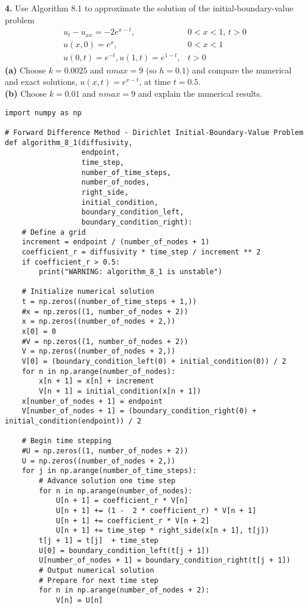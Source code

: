 \documentclass{amsbook}%
\theoremstyle{plain}
\numberwithin{equation}{section}
\begin{document}
		\noindent\textbf{4.} Use Algorithm 8.1 to approximate the solution of the initial-boundary-value problem
		\begin{align}
			u_t-u_{xx}=-2e^{x-t}, & 0<x<1,\, t>0\\
			u(x,0)=e^x, & 0<x<1\\
			u(0,t)=e^{-t}, u(1,t)=e^{1-t}, & t>0
		\end{align}
		\textbf{(a)} Choose $k=0.0025$ and $nmax=9$ (so $h=0.1$) and compare the numerical and exact solutions, $u(x,t)=e^{x-t}$, at time $t=0.5$.\\
		\textbf{(b)} Choose $k=0.01$ and $nmax=9$ and explain the numerical results.
		\\[12pt]
\begin{small}
\begin{verbatim}
import numpy as np

# Forward Difference Method - Dirichlet Initial-Boundary-Value Problem
def algorithm_8_1(diffusivity,
                  endpoint,
                  time_step,
                  number_of_time_steps,
                  number_of_nodes,
                  right_side,
                  initial_condition,
                  boundary_condition_left,
                  boundary_condition_right):
    # Define a grid
    increment = endpoint / (number_of_nodes + 1)
    coefficient_r = diffusivity * time_step / increment ** 2
    if coefficient_r > 0.5:
        print("WARNING: algorithm_8_1 is unstable")
        
    # Initialize numerical solution
    t = np.zeros((number_of_time_steps + 1,))
    #x = np.zeros((1, number_of_nodes + 2))
    x = np.zeros((number_of_nodes + 2,))
    x[0] = 0
    #V = np.zeros((1, number_of_nodes + 2))
    V = np.zeros((number_of_nodes + 2,))
    V[0] = (boundary_condition_left(0) + initial_condition(0)) / 2
    for n in np.arange(number_of_nodes):
        x[n + 1] = x[n] + increment
        V[n + 1] = initial_condition(x[n + 1])
    x[number_of_nodes + 1] = endpoint
    V[number_of_nodes + 1] = (boundary_condition_right(0) + initial_condition(endpoint)) / 2

    # Begin time stepping
    #U = np.zeros((1, number_of_nodes + 2))
    U = np.zeros((number_of_nodes + 2,))    
    for j in np.arange(number_of_time_steps):
        # Advance solution one time step
        for n in np.arange(number_of_nodes):
            U[n + 1] = coefficient_r * V[n]
            U[n + 1] += (1 -  2 * coefficient_r) * V[n + 1]
            U[n + 1] += coefficient_r * V[n + 2]
            U[n + 1] += time_step * right_side(x[n + 1], t[j])
        t[j + 1] = t[j]  + time_step
        U[0] = boundary_condition_left(t[j + 1])
        U[number_of_nodes + 1] = boundary_condition_right(t[j + 1])        
        # Output numerical solution
        # Prepare for next time step
        for n in np.arange(number_of_nodes + 2):
            V[n] = U[n]
            

\end{verbatim}
\end{small}
\end{document}
